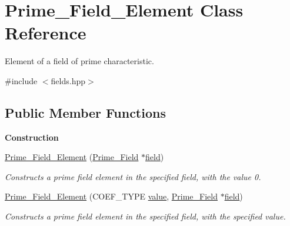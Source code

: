 \hypertarget{class_prime___field___element}{}\section{Prime\+\_\+\+Field\+\_\+\+Element Class Reference}
\label{class_prime___field___element}


Element of a field of prime characteristic.  




{\ttfamily \#include $<$fields.\+hpp$>$}

\subsection*{Public Member Functions}
\begin{Indent}\textbf{ Construction}\par
\begin{DoxyCompactItemize}
\item 
\hyperlink{class_prime___field___element_a52db0c88a43489efba10059b71d832ec}{Prime\+\_\+\+Field\+\_\+\+Element} (\hyperlink{class_prime___field}{Prime\+\_\+\+Field} $\ast$\hyperlink{class_prime___field___element_af9641451c05d26a2016e21a6ef054c40}{field})
\begin{DoxyCompactList}\small\item\em Constructs a prime field element in the specified field, with the value 0. \end{DoxyCompactList}\item 
\hyperlink{class_prime___field___element_a6868c9957c5ddb60b2313d51b0565636}{Prime\+\_\+\+Field\+\_\+\+Element} (C\+O\+E\+F\+\_\+\+T\+Y\+PE \hyperlink{class_prime___field___element_aa9c68761643afa0b22863904bdfe7e83}{value}, \hyperlink{class_prime___field}{Prime\+\_\+\+Field} $\ast$\hyperlink{class_prime___field___element_af9641451c05d26a2016e21a6ef054c40}{field})
\begin{DoxyCompactList}\small\item\em Constructs a prime field element in the specified field, with the specified value. \end{DoxyCompactList}\end{DoxyCompactItemize}
\end{Indent}
